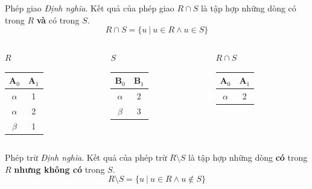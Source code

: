 \documentclass[11pt, handout]{beamer}
\begin{document}
  \begin{frame}{Phép giao}
    \textit{Định nghĩa}. Kết quả của phép giao $R \cap  S$ là tập hợp những dòng có trong $R$ \textbf{và} có trong $S$.
    $$R \cap S = \{u\ |\ u \in R \wedge u \in S\}$$
  \end{frame}
  \begin{frame}
    \begin{columns}[T]
      \begin{column}{0.3\textwidth}
        \centering $R$
        \medskip \\
        \begin{tabular}{|c|c|}
          \hline
          $\textbf{A}_0$ & $\textbf{A}_1$ \\[0.5ex] \hline\hline
          $\alpha$ & 1 \\ \hline
          $\alpha$ & 2 \\ \hline
          $\beta$ & 1 \\ \hline
        \end{tabular}
      \end{column}
      \begin{column}{0.3\textwidth}
        \centering $S$
        \medskip \\
        \begin{tabular}{|c|c|}
          \hline
          $\textbf{B}_0$ & $\textbf{B}_1$ \\[0.5ex] \hline\hline
          $\alpha$ & 2 \\ \hline
          $\beta$ & 3 \\ \hline
        \end{tabular}
      \end{column}
      \begin{column}{0.3\textwidth}
        \centering $R \cap S$
        \medskip \\
        \begin{tabular}{|c|c|}
          \hline
          $\textbf{A}_0$ & $\textbf{A}_1$ \\[0.5ex] \hline\hline
          $\alpha$ & 2 \\ \hline
        \end{tabular}
      \end{column}
    \end{columns}
  \end{frame}
  \begin{frame}{Phép trừ}
    \textit{Định nghĩa}. Kết quả của phép trừ $R \setminus S$ là tập hợp những dòng \textbf{có} trong $R$ 
    \textbf{nhưng không có} trong $S$.
    $$R \setminus S = \{u\ |\ u \in R \wedge u \not\in S\}$$
  \end{frame}
\end{document}
